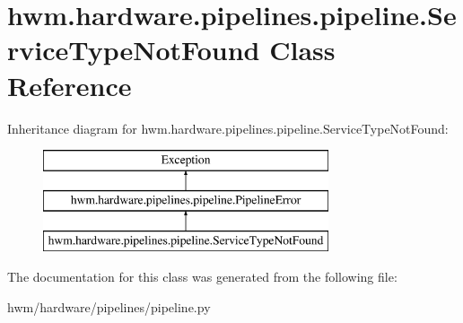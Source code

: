 \hypertarget{classhwm_1_1hardware_1_1pipelines_1_1pipeline_1_1_service_type_not_found}{\section{hwm.\-hardware.\-pipelines.\-pipeline.\-Service\-Type\-Not\-Found Class Reference}
\label{classhwm_1_1hardware_1_1pipelines_1_1pipeline_1_1_service_type_not_found}
}
Inheritance diagram for hwm.\-hardware.\-pipelines.\-pipeline.\-Service\-Type\-Not\-Found\-:\begin{figure}[H]
\begin{center}
\leavevmode
\includegraphics[height=3.000000cm]{classhwm_1_1hardware_1_1pipelines_1_1pipeline_1_1_service_type_not_found}
\end{center}
\end{figure}


The documentation for this class was generated from the following file\-:\begin{DoxyCompactItemize}
\item 
hwm/hardware/pipelines/pipeline.\-py\end{DoxyCompactItemize}
